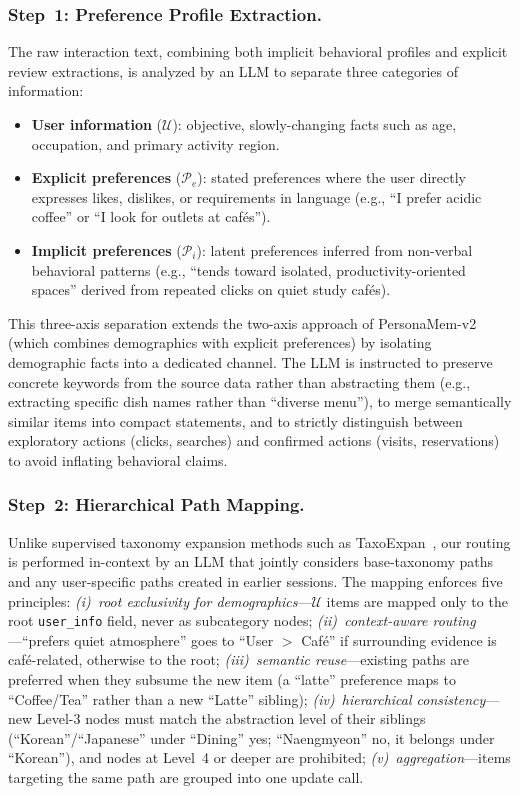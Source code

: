 \documentclass[sigconf,review,anonymous]{acmart}
\begin{document}
\subsubsection{Step~1: Preference Profile Extraction.}
The raw interaction text, combining both implicit behavioral profiles and explicit review extractions, is analyzed by an LLM to separate three categories of information:

\begin{itemize}
    \item \textbf{User information} ($\mathcal{U}$): objective, slowly-changing facts such as age, occupation, and primary activity region.
    \item \textbf{Explicit preferences} ($\mathcal{P}_e$): stated preferences where the user directly expresses likes, dislikes, or requirements in language (e.g., ``I prefer acidic coffee'' or ``I look for outlets at caf\'{e}s'').
    \item \textbf{Implicit preferences} ($\mathcal{P}_i$): latent preferences inferred from non-verbal behavioral patterns (e.g., ``tends toward isolated, productivity-oriented spaces'' derived from repeated clicks on quiet study caf\'{e}s).
\end{itemize}

This three-axis separation extends the two-axis approach of PersonaMem-v2~\cite{personamem-v2} (which combines demographics with explicit preferences) by isolating demographic facts into a dedicated channel. The LLM is instructed to preserve concrete keywords from the source data rather than abstracting them (e.g., extracting specific dish names rather than ``diverse menu''), to merge semantically similar items into compact statements, and to strictly distinguish between exploratory actions (clicks, searches) and confirmed actions (visits, reservations) to avoid inflating behavioral claims.

\subsubsection{Step~2: Hierarchical Path Mapping.}
Unlike supervised taxonomy expansion methods such as TaxoExpan~\cite{taxoexpan}, our routing is performed in-context by an LLM that jointly considers base-taxonomy paths and any user-specific paths created in earlier sessions. The mapping enforces five principles: \textit{(i)~root exclusivity for demographics}---$\mathcal{U}$ items are mapped only to the root \texttt{user\_info} field, never as subcategory nodes; \textit{(ii)~context-aware routing}---``prefers quiet atmosphere'' goes to ``User $>$ Caf\'{e}'' if surrounding evidence is caf\'{e}-related, otherwise to the root; \textit{(iii)~semantic reuse}---existing paths are preferred when they subsume the new item (a ``latte'' preference maps to ``Coffee/Tea'' rather than a new ``Latte'' sibling); \textit{(iv)~hierarchical consistency}---new Level-3 nodes must match the abstraction level of their siblings (``Korean''/``Japanese'' under ``Dining'' yes; ``Naengmyeon'' no, it belongs under ``Korean''), and nodes at Level~4 or deeper are prohibited; \textit{(v)~aggregation}---items targeting the same path are grouped into one update call.
\end{document}
